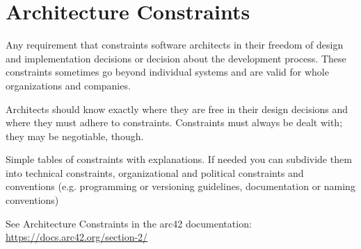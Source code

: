 \section{Architecture Constraints}

Any requirement that constraints software architects in their freedom of design and implementation decisions or decision about the development process. These constraints sometimes go beyond individual systems and are valid for whole organizations and companies.

Architects should know exactly where they are free in their design decisions and where they must adhere to constraints. Constraints must always be dealt with; they may be negotiable, though.

Simple tables of constraints with explanations. If needed you can subdivide them into technical constraints, organizational and political constraints and conventions (e.g. programming or versioning guidelines, documentation or naming conventions)

See Architecture Constraints in the arc42 documentation:
\href{https://docs.arc42.org/section-2/}{https://docs.arc42.org/section-2/}

